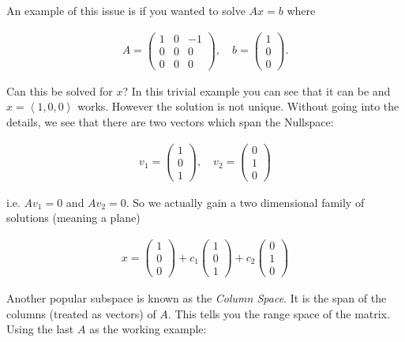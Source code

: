 An example of this issue is if you wanted to solve \(Ax = b\) where

\[\begin{aligned}
A = \begin{pmatrix} 1 & 0 & -1\\ 0 & 0 & 0 \\ 0 & 0 & 0\end{pmatrix},
\quad b = \begin{pmatrix} 1  \\ 0 \\ 0\end{pmatrix} .
\end{aligned}\]

Can this be solved for \(x\)? In this trivial example you can see that
it can be and \(x = \left< 1, 0 , 0\right>\) works. However the solution
is not unique. Without going into the details, we see that there are two
vectors which span the Nullspace:

\[\begin{aligned}
v_1 = \begin{pmatrix} 1  \\ 0 \\ 1\end{pmatrix},
\quad v_2 = \begin{pmatrix} 0  \\ 1 \\ 0\end{pmatrix}
\end{aligned}\]

i.e. \(Av_1 = 0\) and \(Av_2 = 0\). So we actually gain a two
dimensional family of solutions (meaning a plane)

\[\begin{aligned}
x = \begin{pmatrix} 1  \\ 0 \\ 0\end{pmatrix} + c_1\begin{pmatrix} 1  \\ 0 \\ 1\end{pmatrix}  +  c_2\begin{pmatrix} 0  \\ 1 \\ 0\end{pmatrix}
\end{aligned}\]

Another popular subspace is known as the \emph{Column Space}. It is the
span of the columns (treated as vectors) of \(A\). This tells you the
range space of the matrix. Using the last \(A\) as the working example:

